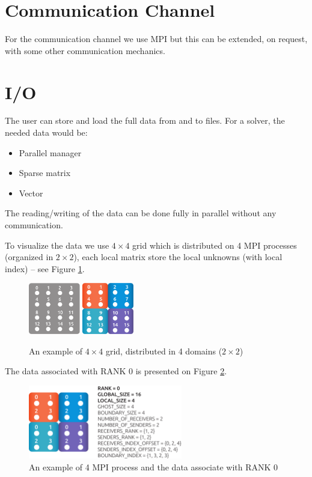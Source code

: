 \section{Communication Channel}

For the communication channel we use MPI but this can be extended, on request, with some other communication mechanics.

\section{I/O}

The user can store and load the full data from and to files. For a solver, the needed data would be:
\begin{itemize}
  \item Parallel manager
  \item Sparse matrix
  \item Vector 
\end{itemize}

The reading/writing of the data can be done fully in parallel without any communication.

To visualize the data we use $4 \times 4$ grid which is distributed on 4 MPI processes (organized in $2 \times 2$), each local matrix store the local unknowns (with local index) -- see Figure \ref{domain-example}.
\begin{figure}[!ht]
\centering
\includegraphics[width=0.2\textwidth]{./fig/mpi-4x4-domain1.pdf}
\hspace{5mm}
\includegraphics[width=0.2\textwidth]{./fig/mpi-4x4-domain2.pdf}
\caption{An example of $4 \times 4$ grid, distributed in 4 domains ($2 \times 2$)}
\label{domain-example}
\end{figure}

The data associated with RANK 0 is presented on Figure \ref{domain-example-data}.
\begin{figure}[!ht]
\centering
\includegraphics[width=0.6\textwidth]{./fig/mpi-4x4-domain3.pdf}
\caption{An example of 4 MPI process and the data associate with RANK 0}
\label{domain-example-data}
\end{figure}


